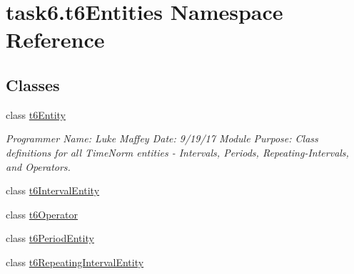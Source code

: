 \hypertarget{namespacetask6_1_1t6Entities}{}\section{task6.\+t6\+Entities Namespace Reference}
\label{namespacetask6_1_1t6Entities}
\subsection*{Classes}
\begin{DoxyCompactItemize}
\item 
class \hyperlink{classtask6_1_1t6Entities_1_1t6Entity}{t6\+Entity}
\begin{DoxyCompactList}\small\item\em Programmer Name\+: Luke Maffey Date\+: 9/19/17 Module Purpose\+: Class definitions for all Time\+Norm entities -\/ Intervals, Periods, Repeating-\/\+Intervals, and Operators. \end{DoxyCompactList}\item 
class \hyperlink{classtask6_1_1t6Entities_1_1t6IntervalEntity}{t6\+Interval\+Entity}
\item 
class \hyperlink{classtask6_1_1t6Entities_1_1t6Operator}{t6\+Operator}
\item 
class \hyperlink{classtask6_1_1t6Entities_1_1t6PeriodEntity}{t6\+Period\+Entity}
\item 
class \hyperlink{classtask6_1_1t6Entities_1_1t6RepeatingIntervalEntity}{t6\+Repeating\+Interval\+Entity}
\end{DoxyCompactItemize}
